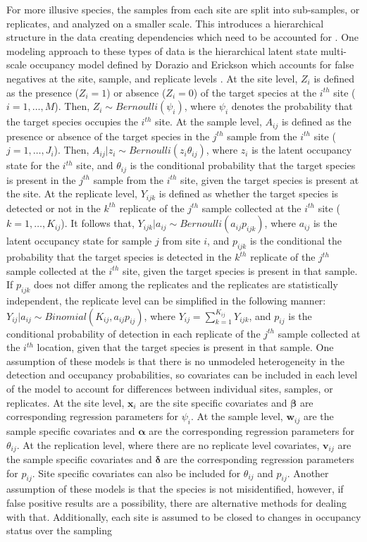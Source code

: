\documentclass[12pt]{article}\usepackage[]{graphicx}\usepackage[]{color}
\begin{document}
For more illusive species, the samples from each site are split into sub-samples, or replicates, and analyzed on a smaller scale. This introduces a hierarchical structure in the data creating dependencies which need to be accounted for \cite{MacKenzie}. One modeling approach to these types of data is the hierarchical latent state multi-scale occupancy model defined by Dorazio and Erickson which accounts for false negatives at the site, sample, and replicate levels \cite{Dorazio_Erickson}. At the site level, $Z_i$ is defined as the presence ($Z_i = 1$) or absence ($Z_i = 0$) of the target species at the $i^{th}$ site ($i = 1, \dots, M$). Then, $Z_i \sim Bernoulli(\psi_i)$, where $\psi_i$ denotes the probability that the target species occupies the $i^{th}$ site. At the sample level, $A_{ij}$ is defined as the presence or absence of the target species in the $j^{th}$ sample from the $i^{th}$ site ($j = 1, \dots, J_i$). Then, $A_{ij}|z_i \sim Bernoulli(z_i\theta_{ij})$, where $z_i$ is the latent occupancy state for the $i^{th}$ site, and $\theta_{ij}$ is the conditional probability that the target species is present in the $j^{th}$ sample from the $i^{th}$ site, given the target species is present at the site. At the replicate level, $Y_{ijk}$ is defined as whether the target species is detected or not in the $k^{th}$ replicate of the $j^{th}$ sample collected at the $i^{th}$ site ($k = 1, \dots, K_{ij}$). It follows that, $Y_{ijk}|a_{ij} \sim Bernoulli(a_{ij}p_{ijk})$, where $a_{ij}$ is the latent occupancy state for sample $j$ from site $i$, and $p_{ijk}$ is the conditional the probability that the target species is detected in the $k^{th}$ replicate of the $j^{th}$ sample collected at the $i^{th}$ site, given the target species is present in that sample. If $p_{ijk}$ does not differ among the replicates and the replicates are statistically independent, the replicate level can be simplified in the following manner: $Y_{ij}|a_{ij} \sim Binomial(K_{ij}, a_{ij}p_{ij})$, where $Y_{ij} = \sum_{k = 1}^{K_{ij}}Y_{ijk}$, and $p_{ij}$ is the conditional probability of detection in each replicate of the $j^{th}$ sample collected at the $i^{th}$ location, given that the target species is present in that sample. One assumption of these models is that there is no unmodeled heterogeneity in the detection and occupancy probabilities, so covariates can be included in each level of the model to account for differences between individual sites, samples, or replicates. At the site level, $\bm{x}_i$ are the site specific covariates and $\bm{\beta}$ are corresponding regression parameters for $\psi_i$. At the sample level, $\bm{w}_{ij}$ are the sample specific covariates and $\bm{\alpha}$ are the corresponding regression parameters for $\theta_{ij}$. At the replication level, where there are no replicate level covariates, $\bm{v}_{ij}$ are the sample specific covariates and $\bm{\delta}$ are the corresponding regression parameters for $p_{ij}$. Site specific covariates can also be included for $\theta_{ij}$ and $p_{ij}$. Another assumption of these models is that the species is not misidentified, however, if false positive results are a possibility, there are alternative methods for dealing with that. Additionally, each site is assumed to be closed to changes in occupancy status over the sampling 
\end{document}
